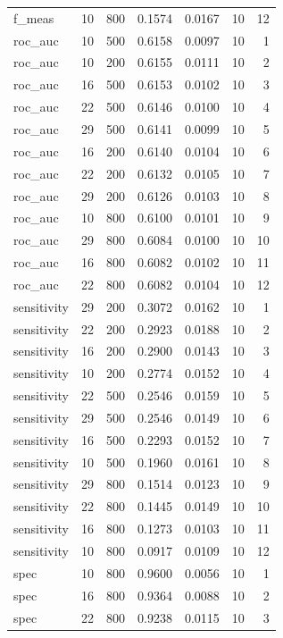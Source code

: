 \documentclass[
  11pt,
  a4paper,
]{article}
\begin{document}
\begin{longtable}[t]{>{\raggedleft\arraybackslash}p{2.4cm}rrrrrr}
f\_meas & 10 & 800 & 0.1574 & 0.0167 & 10 & 12\\
roc\_auc & 10 & 500 & 0.6158 & 0.0097 & 10 & 1\\
\addlinespace
roc\_auc & 10 & 200 & 0.6155 & 0.0111 & 10 & 2\\
roc\_auc & 16 & 500 & 0.6153 & 0.0102 & 10 & 3\\
roc\_auc & 22 & 500 & 0.6146 & 0.0100 & 10 & 4\\
roc\_auc & 29 & 500 & 0.6141 & 0.0099 & 10 & 5\\
roc\_auc & 16 & 200 & 0.6140 & 0.0104 & 10 & 6\\
\addlinespace
roc\_auc & 22 & 200 & 0.6132 & 0.0105 & 10 & 7\\
roc\_auc & 29 & 200 & 0.6126 & 0.0103 & 10 & 8\\
roc\_auc & 10 & 800 & 0.6100 & 0.0101 & 10 & 9\\
roc\_auc & 29 & 800 & 0.6084 & 0.0100 & 10 & 10\\
roc\_auc & 16 & 800 & 0.6082 & 0.0102 & 10 & 11\\
\addlinespace
roc\_auc & 22 & 800 & 0.6082 & 0.0104 & 10 & 12\\
sensitivity & 29 & 200 & 0.3072 & 0.0162 & 10 & 1\\
sensitivity & 22 & 200 & 0.2923 & 0.0188 & 10 & 2\\
sensitivity & 16 & 200 & 0.2900 & 0.0143 & 10 & 3\\
sensitivity & 10 & 200 & 0.2774 & 0.0152 & 10 & 4\\
\addlinespace
sensitivity & 22 & 500 & 0.2546 & 0.0159 & 10 & 5\\
sensitivity & 29 & 500 & 0.2546 & 0.0149 & 10 & 6\\
sensitivity & 16 & 500 & 0.2293 & 0.0152 & 10 & 7\\
sensitivity & 10 & 500 & 0.1960 & 0.0161 & 10 & 8\\
sensitivity & 29 & 800 & 0.1514 & 0.0123 & 10 & 9\\
\addlinespace
sensitivity & 22 & 800 & 0.1445 & 0.0149 & 10 & 10\\
sensitivity & 16 & 800 & 0.1273 & 0.0103 & 10 & 11\\
sensitivity & 10 & 800 & 0.0917 & 0.0109 & 10 & 12\\
spec & 10 & 800 & 0.9600 & 0.0056 & 10 & 1\\
spec & 16 & 800 & 0.9364 & 0.0088 & 10 & 2\\
\addlinespace
spec & 22 & 800 & 0.9238 & 0.0115 & 10 & 3\\

\end{longtable}
\end{document}
